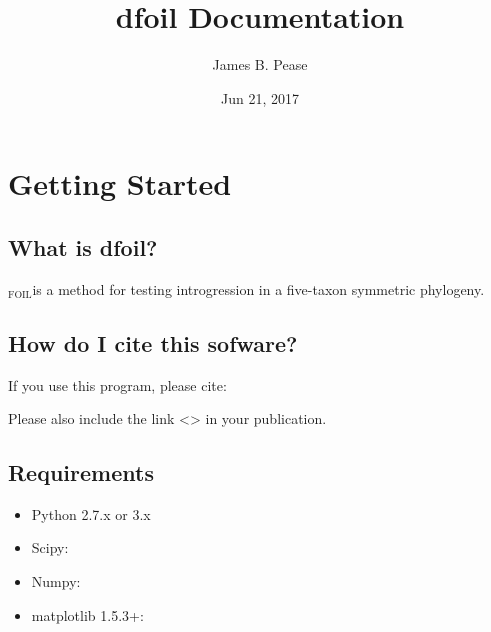 \documentclass[letterpaper,12pt,english]{sphinxmanual}
\title{dfoil Documentation}
\date{Jun 21, 2017}
\author{James B. Pease}
\begin{document}
\maketitle
\sphinxtableofcontents
{}\label{\detokenize{index::doc}}



\chapter{Getting Started}
\label{\detokenize{intro::doc}}\label{\detokenize{intro:getting-started}}\label{\detokenize{intro:welcome-to-dfoil-s-documentation}}

\section{What is dfoil?}
\label{\detokenize{intro:what-is-dfoil}}
$_{\text{FOIL}}$is a method for testing introgression in a five-taxon symmetric phylogeny.


\section{How do I cite this sofware?}
\label{\detokenize{intro:how-do-i-cite-this-sofware}}
If you use this program, please cite:


Please also include the link \textless{}\textgreater{} in your publication.


\section{Requirements}
\label{\detokenize{intro:requirements}}\begin{itemize}
\item {} 
Python 2.7.x or 3.x

\item {} 
Scipy: 

\item {} 
Numpy: 

\item {} 
matplotlib 1.5.3+: 

\end{itemize}
\end{document}
